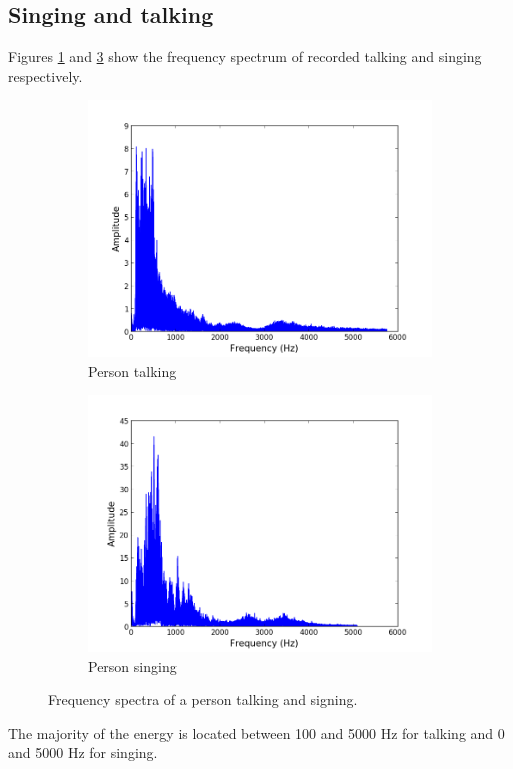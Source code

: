 \subsection{Singing and talking}
Figures \ref{fig:talk} and \ref{fig:song} show the frequency spectrum of recorded talking and singing respectively.
\begin{figure}[H]
\centering
\begin{subfigure}{0.49\textwidth}
\centering
\includegraphics[width=\textwidth]{figures/freqanal/talk.png}
\caption{Person talking}
\label{fig:talk}
\end{subfigure}
\begin{subfigure}{0.49\textwidth}
\centering
\includegraphics[width=\textwidth]{figures/freqanal/song.png}
\caption{Person singing}
\label{fig:song}
\end{subfigure}
\caption{Frequency spectra of a person talking and signing.}
\end{figure}
The majority of the energy is located between 100 and 5000 Hz for talking and 0 and 5000 Hz for singing.
